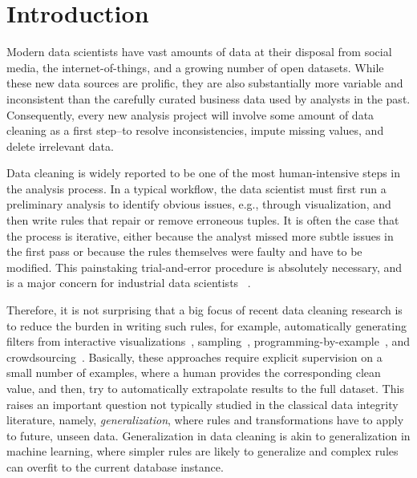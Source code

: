 \section{Introduction}\label{intro}\sloppy
Modern data scientists have vast amounts of data at their disposal from social media, the internet-of-things, and a growing number of open datasets.
While these new data sources are prolific, they are also substantially more variable and inconsistent than the carefully curated business data used by analysts in the past.
Consequently, every new analysis project will involve some amount of data cleaning as a first step--to resolve inconsistencies, impute missing values, and delete irrelevant data.

Data cleaning is widely reported to be one of the most human-intensive steps in the analysis process.
In a typical workflow, the data scientist must first run a preliminary analysis to identify obvious issues, e.g., through visualization, and then write rules that repair or remove erroneous tuples.
It is often the case that the process is iterative, either because the analyst missed more subtle issues in the first pass or because the rules themselves were faulty and have to be modified. 
This painstaking trial-and-error procedure is absolutely necessary, and is a major concern for industrial data scientists ~\cite{krishnan2016hilda}. 


Therefore, it is not surprising that a big focus of recent data cleaning research is to reduce the burden in writing such rules, for example, automatically generating filters from interactive visualizations~\cite{DBLP:journals/pvldb/0002M13}, sampling~\cite{DBLP:journals/debu/KrishnanWFGKM015}, programming-by-example~\cite{wrangler,trifacta}, and crowdsourcing~\cite{gokhale2014corleone,  DBLP:journals/pvldb/YakoutENOI11,  DBLP:journals/pvldb/HaasKWF015,marcus2015crowdsourced}.
Basically, these approaches require explicit supervision on a small number of examples, where a human provides the corresponding clean value, and then, try to automatically extrapolate results to the full dataset.
This raises an important question not typically studied in the classical data integrity literature, namely, \emph{generalization}, where rules and transformations have to apply to future, unseen data.
Generalization in data cleaning is akin to generalization in machine learning, where simpler rules are likely to generalize and complex rules can overfit to the current database instance.

